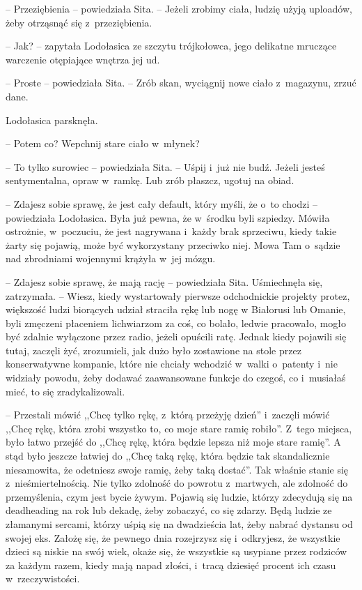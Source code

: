 \documentclass[oneside,polish,11pt,sfheadings]{mwbk}
\begin{document}
-- Przeziębienia -- powiedziała Sita. -- Jeżeli zrobimy ciała, ludzię użyją
uploadów, żeby otrząsnąć się z~przeziębienia.

-- Jak? -- zapytała Lodołasica ze szczytu trójkołowca, jego delikatne
mruczące warczenie otępiające wnętrza jej ud.

-- Proste -- powiedziała Sita. -- Zrób skan, wyciągnij nowe ciało z~magazynu, zrzuć dane.

Lodołasica parsknęła. 

-- Potem co? Wepchnij stare ciało w~młynek?

-- To tylko surowiec -- powiedziała Sita. -- Uśpij i~już nie budź. Jeżeli
jesteś sentymentalna, opraw w~ramkę. Lub zrób płaszcz, ugotuj na obiad.

-- Zdajesz sobie sprawę, że jest cały default, który myśli, że o~to
chodzi -- powiedziała Lodołasica. Była już pewna, że w~środku byli
szpiedzy. Mówiła ostrożnie, w~poczuciu, że jest nagrywana i~każdy brak
sprzeciwu, kiedy takie żarty się pojawią, może być wykorzystany
przeciwko niej. Mowa Tam o~sądzie nad zbrodniami wojennymi krążyła w~jej
mózgu.

-- Zdajesz sobie sprawę, że mają rację -- powiedziała Sita. Uśmiechnęła
się, zatrzymała. -- Wiesz, kiedy wystartowały pierwsze odchodnickie
projekty protez, większość ludzi biorących udział straciła rękę lub nogę
w Białorusi lub Omanie, byli zmęczeni płaceniem lichwiarzom za coś, co
bolało, ledwie pracowało, mogło być zdalnie wyłączone przez radio,
jeżeli opuścili ratę. Jednak kiedy pojawili się tutaj, zaczęli żyć,
zrozumieli, jak dużo było zostawione na stole przez konserwatywne
kompanie, które nie chciały wchodzić w~walki o~patenty i~nie widziały
powodu, żeby dodawać zaawansowane funkcje do czegoś, co i~musiałaś mieć,
to się zradykalizowali.

-- Przestali mówić ,,Chcę tylko rękę, z~którą przeżyję dzień'' i~zaczęli
mówić ,,Chcę rękę, która zrobi wszystko to, co moje stare ramię
robiło''. Z~tego miejsca, było łatwo przejść do ,,Chcę rękę, która
będzie lepsza niż moje stare ramię''. A stąd było jeszcze łatwiej do
,,Chcę taką rękę, która będzie tak skandalicznie niesamowita, że
odetniesz swoje ramię, żeby taką dostać''. Tak właśnie stanie się z~nieśmiertelnością. Nie tylko zdolność do powrotu z~martwych, ale
zdolność do przemyślenia, czym jest bycie żywym. Pojawią się ludzie,
którzy zdecydują się na deadheading na rok lub dekadę, żeby zobaczyć, co
się zdarzy. Będą ludzie ze złamanymi sercami, którzy uśpią się na
dwadzieścia lat, żeby nabrać dystansu od swojej eks. Założę się, że
pewnego dnia rozejrzysz się i~odkryjesz, że wszystkie dzieci są niskie
na swój wiek, okaże się, że wszystkie są usypiane przez rodziców za
każdym razem, kiedy mają napad złości, i~tracą dziesięć procent ich
czasu w~rzeczywistości.
\end{document}
